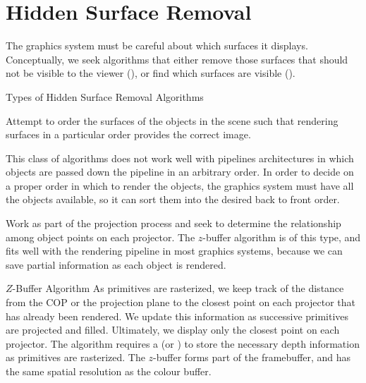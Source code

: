 \documentclass[../COS3712_Notes.tex]{subfiles}
\begin{document}
    \section{Hidden Surface Removal}
      The graphics system must be careful about which surfaces it displays.
      Conceptually, we seek algorithms that either remove those surfaces that should not be
      visible to the viewer (),
      or find which surfaces are visible ().

      \begin{sidenote}{Types of Hidden Surface Removal Algorithms}
        $ $\vspace{-1em}
        \begin{descriptimize}
          \item[Object-Space Algorithms] Attempt to order the surfaces of the objects
            in the scene such that rendering surfaces in a particular order provides
            the correct image.

            This class of algorithms does not work well with pipelines architectures
            in which objects are passed down the pipeline in an arbitrary order.
            In order to decide on a proper order in which to render the objects,
            the graphics system must have all the objects available,
            so it can sort them into the desired back to front order.
          \item[Image-Space Algorithms] Work as part of the projection process
            and seek to determine the relationship among object points on each projector.
            The $z$-buffer algorithm is of this type,
            and fits well with the rendering pipeline in most graphics systems,
            because we can save partial information as each object is rendered.
        \end{descriptimize}
      \end{sidenote}

      \begin{definition}{$Z$-Buffer Algorithm}
        As primitives are rasterized, we keep track of the distance from the COP
        or the projection plane to the closest point on each projector that has already
        been rendered.
        We update this information as successive primitives are projected and filled.
        Ultimately, we display only the closest point on each projector.
        The algorithm requires a  (or )
        to store the necessary depth information as primitives are rasterized.
        The $z$-buffer forms part of the framebuffer, and has the same spatial resolution
        as the colour buffer.
      \end{definition}
\end{document}
